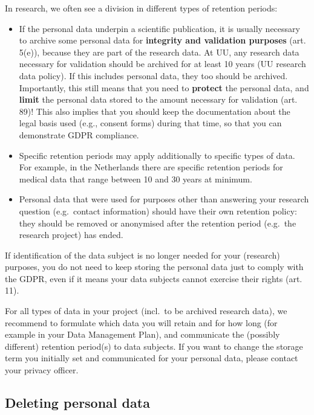 \documentclass[
]{book}
\providecommand{\tightlist}{%
  \setlength{\itemsep}{0pt}\setlength{\parskip}{0pt}}
\begin{document}
In research, we often see a division in different types of retention periods:

\begin{itemize}
\tightlist
\item
  If the personal data underpin a scientific publication, it is usually necessary
  to archive some personal data for \textbf{integrity and validation purposes}
  (art. 5(e)),
  because they are part of the research data. At UU, any research data necessary
  for validation should be archived for at least 10 years
  (UU research data policy).
  If this includes personal data, they too should be archived. Importantly, this
  still means that you need to \textbf{protect} the personal data, and \textbf{limit} the personal
  data stored to the amount necessary for validation
  (art. 89)!
  This also implies that you should keep the documentation about the legal basis
  used (e.g., consent forms) during that time, so that you can demonstrate GDPR
  compliance.
\item
  Specific retention periods may apply additionally to specific types of data.
  For example, in the Netherlands there are specific retention periods for medical data that range between 10 and
  30 years at minimum.
\item
  Personal data that were used for purposes other than answering your
  research question (e.g.~contact information) should have their own retention
  policy: they should be removed or anonymised after the retention period
  (e.g.~the research project) has ended.
\end{itemize}

If identification of the data subject is no longer needed for your
(research) purposes, you do not need to keep storing the personal data just
to comply with the GDPR, even if it means your data subjects cannot exercise
their rights (art. 11).

For all types of data in your project (incl.~to be archived research data), we
recommend to formulate which data you will retain and for how long (for example
in your Data Management Plan), and communicate the (possibly different)
retention period(s) to data subjects. If you want to change the storage term you
initially set and communicated for your personal data, please contact your
privacy officer.

\hypertarget{deleting-personal-data}{%
\subsection{Deleting personal data}\label{deleting-personal-data}}
\end{document}
